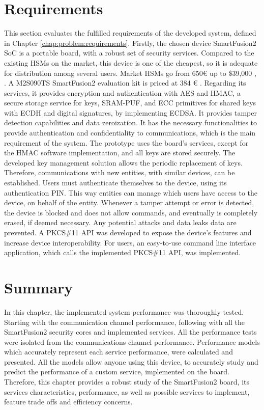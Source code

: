 \section{Requirements}\label{chap:evaluation:requirements}

This section evaluates the fulfilled requirements of the developed system, defined in Chapter \ref{chap:problem:requirements}.
Firstly, the chosen device SmartFusion2 SoC is a portable board, with a robust set of security services.
Compared to the existing HSMs on the market, this device is one of the cheapest, so it is adequate for distribution among several users. Market HSMs go from 650€ up to \$39,000 \cite{HSMpriceArticles}, \cite{HSMPresentationPrices}. A M2S090TS SmartFusion2 evaluation kit is priced at 384 € \cite{smartfusionPrice}.
Regarding its services, it provides encryption and authentication with AES and HMAC, a secure storage service for keys, SRAM-PUF, and ECC primitives for shared keys with ECDH and digital signatures, by implementing ECDSA. It provides tamper detection capabilities and data zeroization.
It has the necessary functionalities to provide authentication and confidentiality to communications, which is the main requirement of the system.
The prototype uses the board's services, except for the HMAC software implementation, and all keys are stored securely.
The developed key management solution allows the periodic replacement of keys. Therefore, communications with new entities, with similar devices, can be established.
Users must authenticate themselves to the device, using its authentication PIN. This way entities can manage which users have access to the device, on behalf of the entity.
Whenever a tamper attempt or error is detected, the device is blocked and does not allow commands, and eventually is completely erased, if deemed necessary. Any potential attacks and data leaks data are prevented.
A PKCS\#11 API was developed to expose the device's features and increase device interoperability. For users, an easy-to-use command line interface application, which calls the implemented PKCS\#11 API, was implemented.

\section*{Summary}\label{chap:evaluation:summary}

In this chapter, the implemented system performance was thoroughly tested. Starting with the communication channel performance, following with all the SmartFusion2 security cores and implemented services. All the performance tests were isolated from the communications channel performance. Performance models which accurately represent each service performance, were calculated and presented. All the models allow anyone using this device, to accurately study and predict the performance of a custom service, implemented on the board. Therefore, this chapter provides a robust study of the SmartFusion2 board, its services characteristics, performance, as well as possible services to implement, feature trade offs and efficiency concerns.
